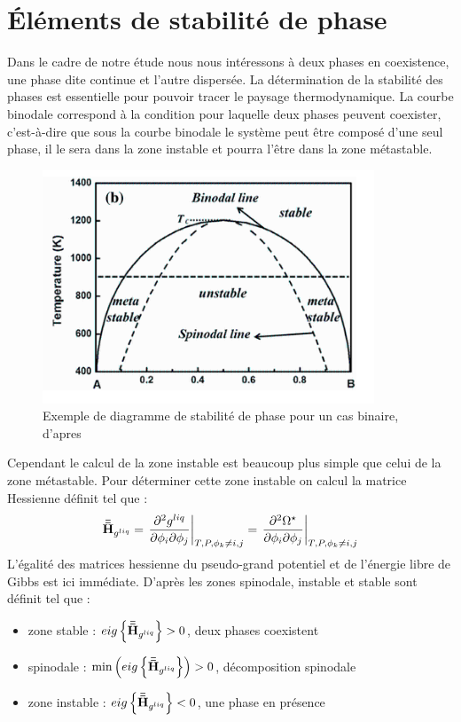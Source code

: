 \section{Éléments de stabilité de phase}
Dans le cadre de notre étude nous nous intéressons à deux phases en coexistence, une phase dite continue et l'autre dispersée. La détermination de la stabilité des phases est essentielle pour pouvoir tracer le paysage thermodynamique. La courbe binodale correspond à la condition pour laquelle deux phases peuvent coexister, c'est-à-dire que sous la courbe binodale le système peut être composé d'une seul phase, il le sera dans la zone instable et pourra l'être dans la zone métastable.
\begin{figure}[h!]
	\centering
	\includegraphics[width=0.5\linewidth]{figure/metastable}
	\caption[Exemple de diagramme de stabilité de phase pour un cas binaire, d'apres]{Exemple de diagramme de stabilité de phase pour un cas binaire, d'apres}
	\label{fig:metastable}
\end{figure}
Cependant le calcul de la zone instable est beaucoup plus simple que celui de la zone métastable. Pour déterminer cette zone instable on calcul la matrice Hessienne définit tel que : 
\begin{equation}
	\mathbf{\bar{\bar{H}}}_{g^{liq}} = \left.\frac{\partial^2 g^{liq}}{\partial \phi_i \partial \phi_j}\right|_{T,P,\phi_k\neq i,j}
	=\left.\frac{\partial^2 \Omega^{\star}}{\partial \phi_i \partial \phi_j}\right|_{T,P,\phi_k\neq i,j}
\end{equation}
L'égalité des matrices hessienne du pseudo-grand potentiel et de l'énergie libre de Gibbs est ici immédiate. D'après \cite{aursand_spinodal_2017} les zones spinodale, instable et stable sont définit tel que :
\begin{itemize}
	\item zone stable : $\displaystyle eig\left\{\mathbf{\bar{\bar{H}}}_{g^{liq}} \right\} > 0$, deux phases coexistent \\ 
	\item spinodale : $\displaystyle \min \left( eig \left\{\mathbf{\bar{\bar{H}}}_{g^{liq}}\right\} \right) > 0$, décomposition spinodale \\
	\item zone instable : $\displaystyle eig\left\{\mathbf{\bar{\bar{H}}}_{g^{liq}} \right\} < 0$, une phase en présence \\ 
\end{itemize}
